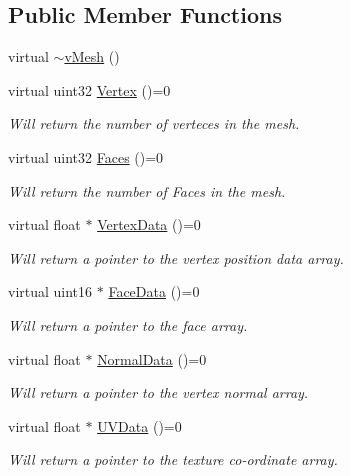 \subsection*{Public Member Functions}
\begin{DoxyCompactItemize}
\item 
virtual \hyperlink{classv_mesh_a5f63d5d63be074b19d4434ed52a1d377}{$\sim$vMesh} ()
\item 
virtual uint32 \hyperlink{classv_mesh_aabeab7681d42365740ca4bcd91255863}{Vertex} ()=0
\begin{DoxyCompactList}\small\item\em Will return the number of verteces in the mesh. \item\end{DoxyCompactList}\item 
virtual uint32 \hyperlink{classv_mesh_a66714f612afa9ea82649e3f825392493}{Faces} ()=0
\begin{DoxyCompactList}\small\item\em Will return the number of Faces in the mesh. \item\end{DoxyCompactList}\item 
virtual float $\ast$ \hyperlink{classv_mesh_a2614d8ad0d2a3cc991375fe49868e752}{VertexData} ()=0
\begin{DoxyCompactList}\small\item\em Will return a pointer to the vertex position data array. \item\end{DoxyCompactList}\item 
virtual uint16 $\ast$ \hyperlink{classv_mesh_acca058c53ec4af8cf0abccec5bd0537a}{FaceData} ()=0
\begin{DoxyCompactList}\small\item\em Will return a pointer to the face array. \item\end{DoxyCompactList}\item 
virtual float $\ast$ \hyperlink{classv_mesh_a542840c478d401b696ad0249138c0864}{NormalData} ()=0
\begin{DoxyCompactList}\small\item\em Will return a pointer to the vertex normal array. \item\end{DoxyCompactList}\item 
virtual float $\ast$ \hyperlink{classv_mesh_ad5cd715eac3c7adb7fb40dcdb30c7194}{UVData} ()=0
\begin{DoxyCompactList}\small\item\em Will return a pointer to the texture co-\/ordinate array. \item\end{DoxyCompactList}\item 

\end{DoxyCompactItemize}
